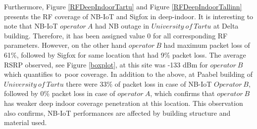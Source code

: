 \documentclass[12pt]{article}
\begin{document}
Furthermore, Figure \ref{RFDeepIndoorTartu} and Figure \ref{RFDeepIndoorTallinn} presents the RF coverage of NB-IoT and Sigfox in deep-indoor. It is interesting to note that NB-IoT $operator\ A$ had NB outage in $University\ of\ Tartu$ at Delta building. Therefore, it has been assigned value 0 for all corresponding RF parameters. However, on the other hand $operator\ B$ had maximum packet loss of 61\%, followed by Sigfox for same location that had 9\% packet loss. The average RSRP observed, see Figure \ref{boxplot}, at this site was -133 dBm for $operator\ B$ which quantifies to\ poor coverage. In addition to the above, at Paabel building of $University\ of\ Tartu$ there were 33\% of packet loss in case of NB-IoT $Operator\ B$, followed by 0\% packet loss in case of $operator\  A$, which confirms that $operator\ B$ has weaker deep indoor coverage penetration at this location. This observation also confirms, NB-IoT performances are affected by building structure and material used.\par
\end{document}
